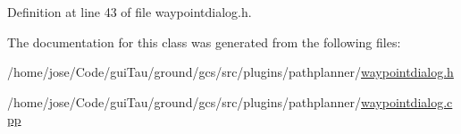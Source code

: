 Definition at line 43 of file waypointdialog.\-h.



The documentation for this class was generated from the following files\-:\begin{DoxyCompactItemize}
\item 
/home/jose/\-Code/gui\-Tau/ground/gcs/src/plugins/pathplanner/\hyperlink{waypointdialog_8h}{waypointdialog.\-h}\item 
/home/jose/\-Code/gui\-Tau/ground/gcs/src/plugins/pathplanner/\hyperlink{waypointdialog_8cpp}{waypointdialog.\-cpp}\end{DoxyCompactItemize}
